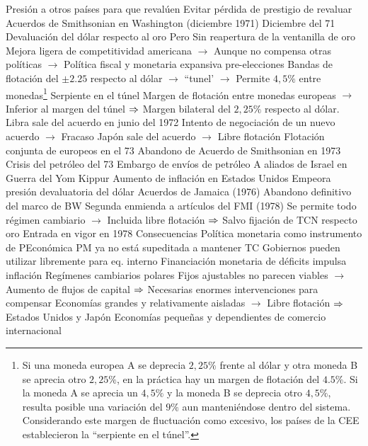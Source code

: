 \documentclass{nuevotema}
\begin{document}
\begin{esquemal}
				\4 Presión a otros países para que revalúen
				\4[] Evitar pérdida de prestigio de revaluar
			\3 Acuerdos de Smithsonian en Washington (diciembre 1971)
				\4 Diciembre del 71
				\4 Devaluación del dólar respecto al oro
				\4[] Pero Sin reapertura de la ventanilla de oro
				\4[] Mejora ligera de competitividad americana
				\4[] $\to$ Aunque no compensa otras políticas
				\4[] $\to$ Política fiscal y monetaria expansiva pre-elecciones
				\4 Bandas de flotación del $\pm 2.25$ respecto al dólar
				\4[] $\to$ ``tunel'
				\4[] $\to$ Permite $4,5\%$ entre monedas\footnote{Si una moneda europea A se deprecia $2,25\%$ frente al dólar y otra moneda B se aprecia otro $2,25\%$, en la práctica hay un margen de flotación del $4.5\%$. Si la moneda A se aprecia un $4,5\%$ y la moneda B se deprecia otro $4,5\%$, resulta posible una variación del $9\%$ aun manteniéndose dentro del sistema. Considerando este margen de fluctuación como excesivo, los países de la CEE establecieron la ``serpiente en el túnel''.}
				\4 Serpiente en el túnel
				\4[] Margen de flotación entre monedas europeas
				\4[] $\to$ Inferior al margen del túnel
				\4[] $\then$ Margen bilateral del $2,25\%$ respecto al dólar.
				\4 Libra sale del acuerdo en junio del 1972
				\4 Intento de negociación de un nuevo acuerdo
				\4[] $\to$ Fracaso
				\4 Japón sale del acuerdo
				\4[] $\to$ Libre flotación
				\4 Flotación conjunta de europeos en el 73
				\4[$\then$] Abandono de Acuerdo de Smithsonian en 1973
			\3 Crisis del petróleo del 73
				\4 Embargo de envíos de petróleo
				\4[] A aliados de Israel en Guerra del Yom Kippur
				\4 Aumento de inflación en Estados Unidos
				\4 Empeora presión devaluatoria del dólar
			\3 Acuerdos de Jamaica (1976)
				\4 Abandono definitivo del marco de BW
				\4 Segunda enmienda a artículos del FMI (1978)
				\4 Se permite todo régimen cambiario
				\4[] $\to$ Incluida libre flotación
				\4[] $\then$ Salvo fijación de TCN respecto oro
				\4[] Entrada en vigor en 1978
		\2 Consecuencias
			\3 Política monetaria como instrumento de PEconómica
				\4 PM ya no está supeditada a mantener TC
				\4 Gobiernos pueden utilizar libremente para eq. interno
				\4 Financiación monetaria de déficits impulsa inflación
			\3 Regímenes cambiarios polares
				\4 Fijos ajustables no parecen viables
				\4[] $\to$ Aumento de flujos de capital
				\4[] $\then$ Necesarias enormes intervenciones para compensar
				\4 Economías grandes y relativamente aisladas
				\4[] $\to$ Libre flotación
				\4[] $\then$ Estados Unidos y Japón
				\4 Economías pequeñas y dependientes de comercio internacional

\end{esquemal}
\end{document}
